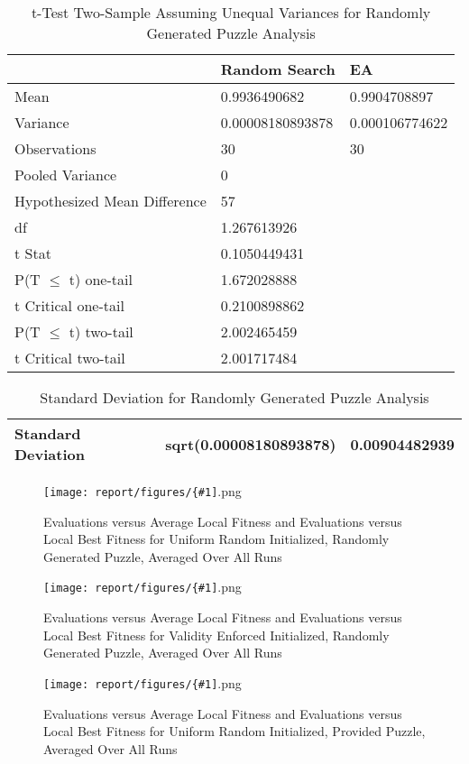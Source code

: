 \documentclass[11pt]{article}
\newcommand{\addgraphic}[1]{\centerline{\texttt{[image: report/figures/\{\#1]}.png}}}
\begin{document}
\begin{table}[H]
\centering
\caption{t-Test Two-Sample Assuming Unequal Variances for Randomly Generated Puzzle Analysis}
\label{bonus_table5}
\begin{tabular}{l|l|l}
 & Random Search & EA \\ \hline
Mean & 0.9936490682 & 0.9904708897 \\
Variance & 0.00008180893878 & 0.000106774622 \\
Observations & 30 & 30 \\
Pooled Variance & 0 &  \\
Hypothesized Mean Difference & 57 &  \\
df & 1.267613926 &  \\
t Stat & 0.1050449431 &  \\
P(T $\leq$ t) one-tail & 1.672028888 &  \\
t Critical one-tail & 0.2100898862 &  \\
P(T $\leq$ t) two-tail & 2.002465459 &  \\
t Critical two-tail & 2.001717484 & 
\end{tabular}
\end{table}


\begin{table}[H]
\centering
\caption{Standard Deviation for Randomly Generated Puzzle Analysis}
\label{bonus_table6}
\begin{tabular}{|l|l|l|}
\hline
Standard Deviation & sqrt(0.00008180893878) & 0.00904482939 \\ \hline
\end{tabular}
\end{table}


\begin{figure}[H]
    \addgraphic{random_gen_log_BONUS_graph}
    \caption{Evaluations versus Average Local Fitness and Evaluations versus Local Best Fitness for Uniform Random Initialized, Randomly Generated Puzzle, Averaged Over All Runs}
    \label{fig:std_rand_bonus}
\end{figure}

\begin{figure}[H]
    \addgraphic{random_gen_log_graph}
    \caption{Evaluations versus Average Local Fitness and Evaluations versus Local Best Fitness for Validity Enforced Initialized, Randomly Generated Puzzle, Averaged Over All Runs}
    \label{fig:std_rand_norm}
\end{figure}

\begin{figure}[H]
    \addgraphic{website_puzzle_log_BONUS_graph}
    \caption{Evaluations versus Average Local Fitness and Evaluations versus Local Best Fitness for Uniform Random Initialized, Provided Puzzle, Averaged Over All Runs}
    \label{fig:std_web_bonus}
\end{figure}
\end{document}
